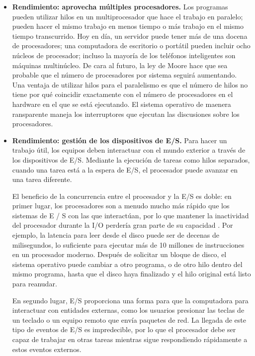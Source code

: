 \documentclass[10pt]{book}
\begin{document}
\begin{itemize}
\item \textbf{Rendimiento: aprovecha múltiples procesadores.} Los programas pueden utilizar hilos en un multiprocesador que hace el trabajo en paralelo; pueden hacer el mismo trabajo en menos tiempo o más trabajo en el mismo tiempo transcurrido. Hoy en día, un servidor puede tener más de una docena de procesadores; una computadora de escritorio o portátil pueden incluir ocho núcleos de procesador; incluso la mayoría de los teléfonos inteligentes son máquinas multinúcleo. De cara al futuro, la ley de Moore hace que sea probable que el número de procesadores por sistema seguirá aumentando. Una ventaja de utilizar hilos para el paralelismo es que el número de hilos no tiene por qué coincidir exactamente con el número de procesadores en el hardware en el que se está ejecutando. El sistema operativo de maenera ransparente maneja los interruptores que ejecutan las discusiones sobre los procesadores.

\item \textbf{Rendimiento: gestión de los dispositivos de E/S.} Para hacer un trabajo útil, los equipos deben interactuar con el mundo exterior a través de los dispositivos de E/S. Mediante la ejecución de tareas como hilos separados, cuando una tarea está a la espera de E/S, el procesador puede avanzar en una tarea diferente.

El beneficio de la concurrencia entre el procesador y la E/S es doble: en primer lugar, los procesadores son a menudo mucho más rápido que los sistemas de E / S con las que interactúan, por lo que mantener la inactividad del procesador durante la I/O perdería gran parte de su capacidad . Por ejemplo, la latencia para leer desde el disco puede ser de decenas de milisegundos, lo suficiente para ejecutar más de 10 millones de instrucciones en un procesador moderno. Después de solicitar un bloque de disco, el sistema operativo puede cambiar a otro programa, o de otro hilo dentro del mismo programa, hasta que el disco haya finalizado y el hilo original está listo para reanudar.

En segundo lugar, E/S proporciona una forma para que la computadora para interactuar con entidades externas, como los usuarios presionar las teclas de un teclado o un equipo remoto que envía paquetes de red. La llegada de este tipo de eventos de E/S es impredecible, por lo que el procesador debe ser capaz de trabajar en otras tareas mientras sigue respondiendo rápidamente a estos eventos externos.
\end{itemize}
\end{document}
